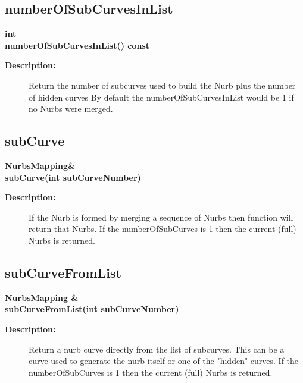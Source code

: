 \subsection{numberOfSubCurvesInList}
 
\begin{flushleft} \textbf{%
int  \\ 
\settowidth{\NurbsMappingIncludeArgIndent}{numberOfSubCurvesInList(}%
numberOfSubCurvesInList() const
}\end{flushleft}
\begin{description}
\item[{\bf Description:}] 
  Return the number of subcurves used to build the Nurb plus the number of hidden curves
  By default the numberOfSubCurvesInList would be 1 if no Nurbs were merged.
\end{description}
\subsection{subCurve}
 
\begin{flushleft} \textbf{%
NurbsMapping\&  \\ 
\settowidth{\NurbsMappingIncludeArgIndent}{subCurve(}%
subCurve(int subCurveNumber)
}\end{flushleft}
\begin{description}
\item[{\bf Description:}] 
  If the Nurb is formed by merging a sequence of Nurbs then function will return that Nurbs.
 If the numberOfSubCurves is 1 then the current (full) Nurbs is returned.
  
\end{description}
\subsection{subCurveFromList}
 
\begin{flushleft} \textbf{%
NurbsMapping \&  \\ 
\settowidth{\NurbsMappingIncludeArgIndent}{subCurveFromList(}%
subCurveFromList(int subCurveNumber)
}\end{flushleft}
\begin{description}
\item[{\bf Description:}] 
  Return a nurb curve directly from the list of subcurves.  This can be a curve used to generate
 the nurb itself or one of the "hidden" curves.
 If the numberOfSubCurves is 1 then the current (full) Nurbs is returned.
  
\end{description}
